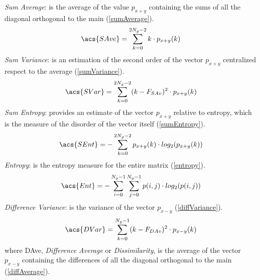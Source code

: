 \documentclass[final,a4paper,12pt,english]{UnicaPhdThesis3}
\begin{document}
	\textit{Sum Average}: is the average of the value $p_{x+y}$ containing the sums of all the diagonal orthogonal to the main (\ref{sumAverage}).
	\begin{equation}\label{sumAverage}
	\acs{SAve}=\sum_{k=0}^{2N_{g}-2}k\cdot p_{x+y}(k)
	\end{equation}
	\textit{Sum Variance}: is an estimation of the second order of the vector $p_{x+y}$ centralized respect to the average (\ref{sumVariance}).
	\begin{equation}\label{sumVariance}
	\acs{SVar}=\sum_{k=0}^{2N_{g}-2}(k - F_{SAv})^2 \cdot p_{x+y}(k)
	\end{equation}
	\textit{Sum Entropy}: provides an estimate of the vector $p_{x+y}$ relative to entropy, which is the measure of the disorder of the vector itself (\ref{sumEntropy}).
	\begin{equation}\label{sumEntropy}
	\acs{SEnt}=-\sum_{k=0}^{2N_{g}-2}p_{x+y}(k)\cdot log_2(p_{x+y}(k))
	\end{equation}
	\textit{Entropy}: is the entropy measure for the entire matrix (\ref{entropy}).
	\begin{equation}\label{entropy}
	\acs{Ent}=-\sum_{i=0}^{N_{g}-1}\sum_{j=0}^{N_{g}-1} p(i,j)\cdot log_2(p(i,j))
	\end{equation}
	\textit{Difference Variance}: is the variance of the vector $p_{x-y}$ (\ref{diffVariance}).
	\begin{equation}\label{diffVariance}
	\acs{DVar}=\sum_{k=0}^{N_{g}-1}(k - F_{DAv})^2 \cdot p_{x-y}(k)
	\end{equation}
	where \acs{DAve}, \textit{Difference Average} or \textit{Dissimilarity}, is the average of the vector $p_{x-y}$ containing the differences of all the diagonal orthogonal to the main (\ref{diffAverage}).
	
\end{document}
